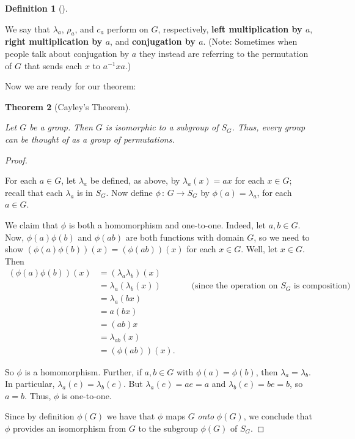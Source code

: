 \documentclass[10pt,]{book}
\newcommand{\terminology}[1]{\textbf{#1}}
\theoremstyle{plain}
\newtheorem{theorem}{Theorem}[section]
\theoremstyle{definition}
\newtheorem{definition}[theorem]{Definition}
\theoremstyle{definition}
\theoremstyle{definition}
\theoremstyle{definition}
\numberwithin{equation}{section}
\newcommand{\amp}{ & }
\begin{document}
\begin{definition}[{}]\label{definition-50}

We say that \(\lambda_a\), \(\rho_a\), and \(c_a\)
    perform on \(G\), respectively, \terminology{left multiplication by \(a\)}, \terminology{right multiplication by \(a\)}, and \terminology{conjugation by \(a\)}. (Note: Sometimes when people talk about conjugation by \(a\) they
    instead are referring to the permutation of \(G\) that sends each \(x\)
    to \(a^{-1}xa\).)
\label{notation-58}
\label{notation-59}
\end{definition}
\par

    Now we are ready for our theorem:
\begin{theorem}[{Cayley's Theorem}]\label{theorem-36}

       Let \(G\) be a group. Then \(G\)
        is isomorphic to a subgroup of \(S_G\). Thus, every group can be
        thought of as a group of permutations.
\end{theorem}
\begin{proof}\hypertarget{proof-30}{}

      For each \(a\in G\), let \(\lambda_a\) be defined, as above, by
      \(\lambda_a(x)=ax\) for each \(x\in G\); recall that each \(\lambda_a\) is
      in \(S_G\). Now define \(\phi\,:\, G\to S_G\) by \(\phi(a)=\lambda_a\),
      for each \(a\in G\).
\par

      We claim that \(\phi\) is both a homomorphism and one-to-one. Indeed,
      let \(a,b\in G\). Now, \(\phi(a)\phi(b)\) and \(\phi(ab)\) are both
      functions with domain \(G\), so we need to show
      \((\phi(a)\phi(b))(x)=(\phi(ab))(x)\) for each \(x\in G\). Well, let
      \(x\in G\). Then
\begin{align*}
(\phi(a)\phi(b))(x)\amp =(\lambda_a\lambda_b)(x)\amp \amp\\
\amp =\lambda_a(\lambda_b(x)) \amp \amp \text{ (since the operation on \(S_G\) is
        composition) }\\
\amp =\lambda_a(bx)\amp \amp\\
\amp =a(bx)\amp \amp\\
\amp =(ab)x\amp \amp\\
\amp =\lambda_{ab}(x)\amp \amp\\
\amp =(\phi(ab))(x).\amp \amp
\end{align*}

\par

      So \(\phi\) is a homomorphism. Further, if \(a, b\in G\) with
      \(\phi(a)=\phi(b)\), then \(\lambda_a=\lambda_b\). In particular,
      \(\lambda_a(e)=\lambda_b(e)\). But \(\lambda_a(e)=ae=a\) and
      \(\lambda_b(e)=be=b\), so \(a=b\). Thus, \(\phi\) is one-to-one.
\par

      Since by definition \(\phi(G)\) we have that \(\phi\) maps \(G\) \emph{onto} \(\phi(G)\), we conclude that \(\phi\) provides an isomorphism
      from \(G\) to the subgroup \(\phi(G)\) of \(S_G\).
\end{proof}
\end{document}

